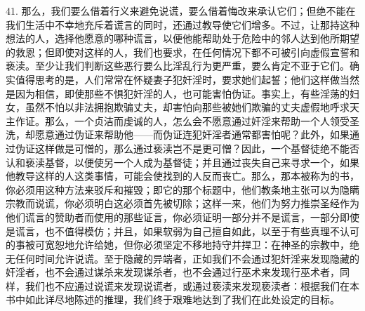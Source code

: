 41. 那么，我们要么借着行义来避免说谎，要么借着悔改来承认它们；但绝不能在我们生活中不幸地充斥着谎言的同时，还通过教导使它们增多。不过，让那持这种想法的人，选择他愿意的哪种谎言，以便他能帮助处于危险中的邻人达到他所期望的救恩；但即使对这样的人，我们也要求，在任何情况下都不可被引向虚假宣誓和亵渎。至少让我们判断这些恶行要么比淫乱行为更严重，要么肯定不亚于它们。确实值得思考的是，人们常常在怀疑妻子犯奸淫时，要求她们起誓；他们这样做当然是因为相信，即使那些不惧犯奸淫的人，也可能害怕伪证。事实上，有些淫荡的妇女，虽然不怕以非法拥抱欺骗丈夫，却害怕向那些被她们欺骗的丈夫虚假地呼求天主作证。那么，一个贞洁而虔诚的人，怎么会不愿意通过奸淫来帮助一个人领受圣洗，却愿意通过伪证来帮助他——而伪证连犯奸淫者通常都害怕呢？此外，如果通过伪证这样做是可憎的，那么通过亵渎岂不是更可憎？因此，一个基督徒绝不能否认和亵渎基督，以便使另一个人成为基督徒；并且通过丧失自己来寻求一个，如果他教导这样的人这类事情，可能会使找到的人反而丧亡。那么，那本被称为的书，你必须用这种方法来驳斥和摧毁；即它的那个标题中，他们教条地主张可以为隐瞒宗教而说谎，你必须明白这必须首先被切除；这样一来，他们为努力推崇圣经作为他们谎言的赞助者而使用的那些证言，你必须证明一部分并不是谎言，一部分即使是谎言，也不值得模仿；并且，如果软弱为自己擅自如此，以至于有些真理不认可的事被可宽恕地允许给她，但你必须坚定不移地持守并捍卫：在神圣的宗教中，绝无任何时间允许说谎。至于隐藏的异端者，正如我们不会通过犯奸淫来发现隐藏的奸淫者，也不会通过谋杀来发现谋杀者，也不会通过行巫术来发现行巫术者，同样，我们也不应通过说谎来发现说谎者，或通过亵渎来发现亵渎者：根据我们在本书中如此详尽地陈述的推理，我们终于艰难地达到了我们在此处设定的目标。\par

